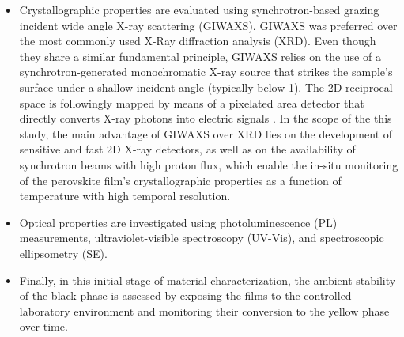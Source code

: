 \begin{itemize}
    \item  Crystallographic properties are evaluated using synchrotron-based grazing incident wide angle X-ray scattering (GIWAXS). GIWAXS was preferred over the most commonly used X-Ray diffraction analysis (XRD). Even though they share a similar fundamental principle, GIWAXS relies on the use of a synchrotron-generated monochromatic X-ray source that strikes the sample's surface under a shallow incident angle (typically below 1\degree). The 2D reciprocal space is followingly mapped by means of a pixelated area detector that directly converts X-ray photons into electric signals \cite{Steele2023HowFilms}. In the scope of the this study, the main advantage of GIWAXS over XRD lies on the development of sensitive and fast 2D X-ray detectors, as well as on the availability of synchrotron beams with high proton flux, which enable the in-situ monitoring of the perovskite film's crystallographic properties as a function of temperature with high temporal resolution. 
        
    \item  Optical properties are investigated using photoluminescence (PL) measurements, ultraviolet-visible spectroscopy (UV-Vis), and spectroscopic ellipsometry (SE).

    \item  Finally, in this initial stage of material characterization, the ambient stability of the  black phase is assessed by exposing the films to the controlled laboratory environment and monitoring their conversion to the yellow phase over time.
\end{itemize}


